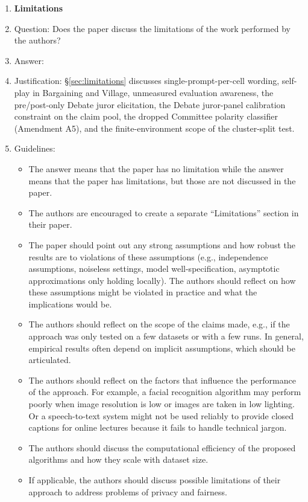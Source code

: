 \documentclass{article}
\begin{document}
\begin{enumerate}
\item {\bf Limitations}
    \item[] Question: Does the paper discuss the limitations of the work performed by the authors?
    \item[] Answer: \answerYes{} %
    \item[] Justification: \S\ref{sec:limitations} discusses single-prompt-per-cell wording, self-play in Bargaining and Village, unmeasured evaluation awareness, the pre/post-only Debate juror elicitation, the Debate juror-panel calibration constraint on the claim pool, the dropped Committee polarity classifier (Amendment A5), and the finite-environment scope of the cluster-split test.
    \item[] Guidelines:
    \begin{itemize}
        \item The answer \answerNA{} means that the paper has no limitation while the answer \answerNo{} means that the paper has limitations, but those are not discussed in the paper. 
        \item The authors are encouraged to create a separate ``Limitations'' section in their paper.
        \item The paper should point out any strong assumptions and how robust the results are to violations of these assumptions (e.g., independence assumptions, noiseless settings, model well-specification, asymptotic approximations only holding locally). The authors should reflect on how these assumptions might be violated in practice and what the implications would be.
        \item The authors should reflect on the scope of the claims made, e.g., if the approach was only tested on a few datasets or with a few runs. In general, empirical results often depend on implicit assumptions, which should be articulated.
        \item The authors should reflect on the factors that influence the performance of the approach. For example, a facial recognition algorithm may perform poorly when image resolution is low or images are taken in low lighting. Or a speech-to-text system might not be used reliably to provide closed captions for online lectures because it fails to handle technical jargon.
        \item The authors should discuss the computational efficiency of the proposed algorithms and how they scale with dataset size.
        \item If applicable, the authors should discuss possible limitations of their approach to address problems of privacy and fairness.

\end{itemize}
\end{enumerate}
\end{document}
